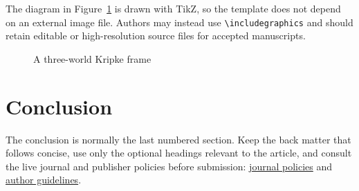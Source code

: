 \documentclass{PL}
\theoremstyle{definition}
\begin{document}
The diagram in Figure~\ref{fig:frame} is drawn with TikZ, so the template does not depend on an external image file. Authors may instead use \verb|\includegraphics| and should retain editable or high-resolution source files for accepted manuscripts.

\begin{figure}[tb]
  \centering
  \caption{A three-world Kripke frame}%
  \label{fig:frame}
\end{figure}

\section{Conclusion}

The conclusion is normally the last numbered section. Keep the back matter that follows concise, use only the optional headings relevant to the article, and consult the live journal and publisher policies before submission: \href{https://www.philosophical-logic.org/site/journal-policies/}{journal policies} and \href{https://www.philosophical-logic.org/site/author-guidelines/}{author guidelines}.




\end{document}
